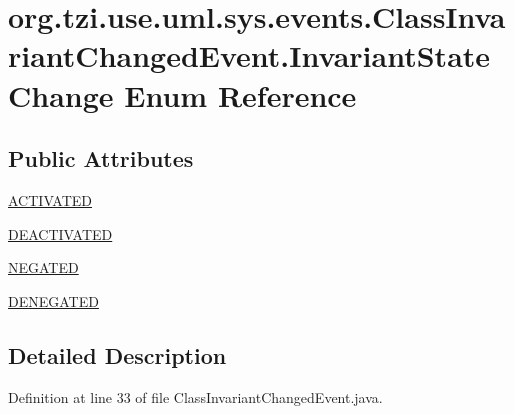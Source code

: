 \hypertarget{enumorg_1_1tzi_1_1use_1_1uml_1_1sys_1_1events_1_1_class_invariant_changed_event_1_1_invariant_state_change}{\section{org.\-tzi.\-use.\-uml.\-sys.\-events.\-Class\-Invariant\-Changed\-Event.\-Invariant\-State\-Change Enum Reference}
\label{enumorg_1_1tzi_1_1use_1_1uml_1_1sys_1_1events_1_1_class_invariant_changed_event_1_1_invariant_state_change}
}
\subsection*{Public Attributes}
\begin{DoxyCompactItemize}
\item 
\hyperlink{enumorg_1_1tzi_1_1use_1_1uml_1_1sys_1_1events_1_1_class_invariant_changed_event_1_1_invariant_state_change_a2b313d2a5d568f22e940728381309999}{A\-C\-T\-I\-V\-A\-T\-E\-D}
\item 
\hyperlink{enumorg_1_1tzi_1_1use_1_1uml_1_1sys_1_1events_1_1_class_invariant_changed_event_1_1_invariant_state_change_a6bca3b759e16b59f1b33d7f6ea0a67e1}{D\-E\-A\-C\-T\-I\-V\-A\-T\-E\-D}
\item 
\hyperlink{enumorg_1_1tzi_1_1use_1_1uml_1_1sys_1_1events_1_1_class_invariant_changed_event_1_1_invariant_state_change_aa54a3a849da4699a4e3f1cabc64a9562}{N\-E\-G\-A\-T\-E\-D}
\item 
\hyperlink{enumorg_1_1tzi_1_1use_1_1uml_1_1sys_1_1events_1_1_class_invariant_changed_event_1_1_invariant_state_change_a9201e2f635f73e9deb624f5354bfc18b}{D\-E\-N\-E\-G\-A\-T\-E\-D}
\end{DoxyCompactItemize}


\subsection{Detailed Description}


Definition at line 33 of file Class\-Invariant\-Changed\-Event.\-java.



